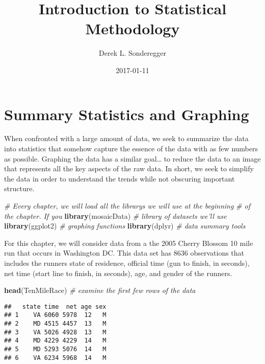\documentclass[]{book}
\title{Introduction to Statistical Methodology}
\author{Derek L. Sonderegger}
\date{2017-01-11}
\newenvironment{Shaded}{\begin{snugshade}}{\end{snugshade}}
\newcommand{\KeywordTok}[1]{\textcolor[rgb]{0.13,0.29,0.53}{\textbf{{#1}}}}
\newcommand{\CommentTok}[1]{\textcolor[rgb]{0.56,0.35,0.01}{\textit{{#1}}}}
\newcommand{\NormalTok}[1]{{#1}}
\begin{document}
\maketitle

{
\setcounter{tocdepth}{1}
\tableofcontents
}
\chapter{Summary Statistics and
Graphing}\label{summary-statistics-and-graphing}

When confronted with a large amount of data, we seek to summarize the
data into statistics that somehow capture the essence of the data with
as few numbers as possible. Graphing the data has a similar goal\ldots{}
to reduce the data to an image that represents all the key aspects of
the raw data. In short, we seek to simplify the data in order to
understand the trends while not obscuring important structure.

\begin{Shaded}
\begin{Highlighting}[]
\CommentTok{# Every chapter, we will load all the librarys we will use at the beginning}
\CommentTok{# of the chapter. If you}
\KeywordTok{library}\NormalTok{(mosaicData) }\CommentTok{# library of datasets we'll use}
\KeywordTok{library}\NormalTok{(ggplot2)    }\CommentTok{# graphing functions}
\KeywordTok{library}\NormalTok{(dplyr)      }\CommentTok{# data summary tools}
\end{Highlighting}
\end{Shaded}

For this chapter, we will consider data from a the 2005 Cherry Blossom
10 mile run that occurs in Washington DC. This data set has 8636
observations that includes the runners state of residence, official time
(gun to finish, in seconds), net time (start line to finish, in
seconds), age, and gender of the runners.

\begin{Shaded}
\begin{Highlighting}[]
\KeywordTok{head}\NormalTok{(TenMileRace)   }\CommentTok{# examine the first few rows of the data}
\end{Highlighting}
\end{Shaded}

\begin{verbatim}
##   state time  net age sex
## 1    VA 6060 5978  12   M
## 2    MD 4515 4457  13   M
## 3    VA 5026 4928  13   M
## 4    MD 4229 4229  14   M
## 5    MD 5293 5076  14   M
## 6    VA 6234 5968  14   M
\end{verbatim}
\end{document}
